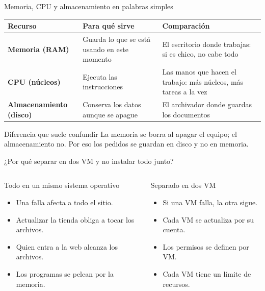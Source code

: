 \documentclass[aspectratio=169,10pt,c]{beamer}
\begin{document}
\begin{frame}{Memoria, CPU y almacenamiento en palabras simples\apoyo}
\begin{center}
\small
\begin{tabular}{>{\bfseries}p{2.9cm}p{4.3cm}p{4.1cm}}
\toprule
Recurso & Para qué sirve & Comparación \\
\midrule
Memoria (RAM) & Guarda lo que se está usando en este momento & El escritorio donde trabajas: si es chico, no cabe todo \\
CPU (núcleos) & Ejecuta las instrucciones & Las manos que hacen el trabajo: más núcleos, más tareas a la vez \\
Almacenamiento (disco) & Conserva los datos aunque se apague & El archivador donde guardas los documentos \\
\bottomrule
\end{tabular}
\end{center}
\vspace{0.15cm}
\begin{block}{Diferencia que suele confundir}
\small La memoria se borra al apagar el equipo; el almacenamiento no. Por eso los pedidos se guardan en disco y no en memoria.
\end{block}
\end{frame}

\begin{frame}{¿Por qué separar en dos VM y no instalar todo junto?}
\begin{columns}[T,onlytextwidth]
\begin{block}{Todo en un mismo sistema operativo}
\small
\begin{itemize}\setlength\itemsep{2pt}
  \item Una falla afecta a todo el sitio.
  \item Actualizar la tienda obliga a tocar los archivos.
  \item Quien entra a la web alcanza los archivos.
  \item Los programas se pelean por la memoria.
\end{itemize}
\end{block}
\begin{exampleblock}{Separado en dos VM}
\small
\begin{itemize}\setlength\itemsep{2pt}
  \item Si una VM falla, la otra sigue.
  \item Cada VM se actualiza por su cuenta.
  \item Los permisos se definen por VM.
  \item Cada VM tiene un límite de recursos.
\end{itemize}
\end{exampleblock}
\end{columns}
\vspace{0.2cm}
\end{frame}
\end{document}
